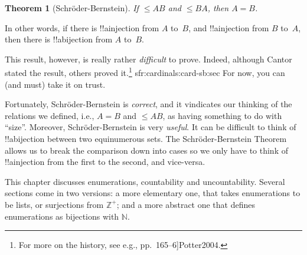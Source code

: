\documentclass[10pt,a4paper]{article}
\makeatletter
\theoremstyle{plain}
\newtheorem{thm}{Theorem}[section]
\theoremstyle{definition}
\theoremstyle{remark}
\newenvironment{explain}{}{}
\newenvironment{editorial}{}{}
\newcommand*{\olchapter}[3]{}
\newcommand*{\olimport}[1]{}
\newcommand*{\ollabel}[1]{\label{#1}}
\newcommand{\olref}{\@ifnextchar[{\olref@i}{\olref@final}}
\def\olref@i[#1]{\@ifnextchar[{\olref@ii}{\olref@final}}
\def\olref@ii[#1]{\@ifnextchar[{\olref@iii}{\olref@final}}
\def\olref@iii[#1]{\olref@final}
\def\olref@final#1{\ref{#1}}
\providecommand{\Nat}{\ensuremath{\mathbb{N}}}
\providecommand{\cardle}{\leq}
\providecommand{\PosInt}{\mathbb{Z}^{+}}
\providecommand{\oliflabeldef}[3]{#1}
\providecommand{\citet}[1]{\cite{#1}}
\providecommand{\cardeq}[2]{#1 = #2}
\providecommand{\cardle}{\leq}
\makeatother
\begin{document}
\begin{thm}[Schr\"oder-Bernstein]
	\ollabel{thm:schroder-bernstein}
	If $\cardle{A}{B}$ and $\cardle{B}{A}$,
	then $\cardeq{A}{B}$.
\end{thm}

\begin{explain}
In other words, if there is !!a{injection} from $A$ to~$B$, and
!!a{injection} from $B$ to~$A$, then there is !!a{bijection} from $A$
to~$B$. 

This result, however, is really rather \emph{difficult} to prove.
Indeed, although Cantor stated the result, others proved
it.\footnote{For more on the history, see e.g.,
\citet[pp.~165--6]{Potter2004}.}
\oliflabeldef{sfr:cardinals:card-sb:sec}{We will only be in
a position to \emph{prove} Schr\"oder-Bernstein in
\olref[sfr][cardinals][card-sb]{sec}.}{}%
For now, you can (and must)
take it on trust. 

Fortunately, Schr\"oder-Bernstein is \emph{correct}, and it
vindicates our thinking of the relations we defined, i.e.,
$\cardeq{A}{B}$ and $\cardle{A}{B}$, as having something to do with
``size''. Moreover, Schr\"oder-Bernstein is very \emph{useful}. It
can be difficult to think of !!a{bijection} between two equinumerous
sets. The Schr\"oder-Bernstein Theorem allows us to break the comparison
down into cases so we only have to think of !!a{injection} from the
first to the second, and vice-versa.
\end{explain}



\olchapter{sfr}{siz}{The Size of Sets}

\begin{editorial}
This chapter discusses enumerations, countability and uncountability.
Several sections come in two versions: a more elementary one, that
takes enumerations to be lists, or surjections from $\PosInt$; and a
more abstract one that defines enumerations as bijections with $\Nat$.
\end{editorial}

\olimport{introduction}

\olimport{enumerability}

\olimport{zig-zag}

\olimport{pairing}

\olimport{pairing-alt}

\olimport{non-enumerability}
\end{document}
